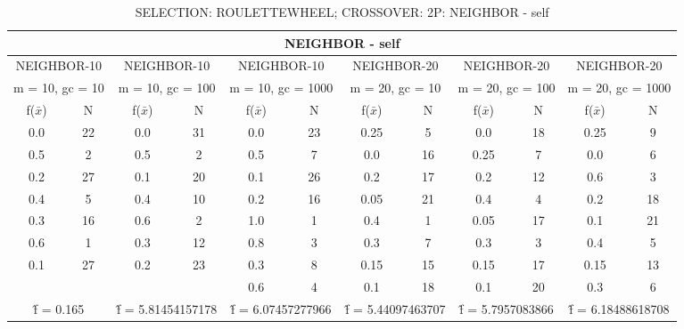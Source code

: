 \begin{table}[H]
	\centering
	\caption{SELECTION: ROULETTEWHEEL; CROSSOVER: 2P: NEIGHBOR - self}
	\begin{adjustbox}{width=1\textwidth}
		\begin{tabular}{ |c|c||c|c||c|c||c|c||c|c||c|c| }
			\hline
			\multicolumn{12}{|c|}{NEIGHBOR - self} \\
			\hline
			\multicolumn{2}{|c||}{NEIGHBOR-10} & \multicolumn{2}{c||}{NEIGHBOR-10} & \multicolumn{2}{c||}{NEIGHBOR-10} & \multicolumn{2}{c||}{NEIGHBOR-20} & \multicolumn{2}{c||}{NEIGHBOR-20} & \multicolumn{2}{c|}{NEIGHBOR-20}\\
			\hline
			\multicolumn{2}{|c||}{m = 10, gc = 10} & \multicolumn{2}{c||}{m = 10, gc = 100} & \multicolumn{2}{c||}{m = 10, gc = 1000} & \multicolumn{2}{c||}{m = 20, gc = 10} & \multicolumn{2}{c||}{m = 20, gc = 100} & \multicolumn{2}{c|}{m = 20, gc = 1000}\\
			\hline
			f($\bar{x}$) & N & f($\bar{x}$) & N & f($\bar{x}$) & N & f($\bar{x}$) & N & f($\bar{x}$) & N & f($\bar{x}$) & N\\
			\hline
			\hline
			0.0 & 22 & 0.0 & 31 & 0.0 & 23 & 0.25 & 5 & 0.0 & 18 & 0.25 & 9\\
			0.5 & 2 & 0.5 & 2 & 0.5 & 7 & 0.0 & 16 & 0.25 & 7 & 0.0 & 6\\
			0.2 & 27 & 0.1 & 20 & 0.1 & 26 & 0.2 & 17 & 0.2 & 12 & 0.6 & 3\\
			0.4 & 5 & 0.4 & 10 & 0.2 & 16 & 0.05 & 21 & 0.4 & 4 & 0.2 & 18\\
			0.3 & 16 & 0.6 & 2 & 1.0 & 1 & 0.4 & 1 & 0.05 & 17 & 0.1 & 21\\
			0.6 & 1 & 0.3 & 12 & 0.8 & 3 & 0.3 & 7 & 0.3 & 3 & 0.4 & 5\\
			0.1 & 27 & 0.2 & 23 & 0.3 & 8 & 0.15 & 15 & 0.15 & 17 & 0.15 & 13\\
			&   &   &   & 0.6 & 4 & 0.1 & 18 & 0.1 & 20 & 0.3 & 6\\
			\hline
			\multicolumn{2}{|c||}{\^{f} = 0.165} & \multicolumn{2}{c||}{\^{f} = 5.81454157178} & \multicolumn{2}{c||}{\^{f} = 6.07457277966} & \multicolumn{2}{c||}{\^{f} = 5.44097463707} & \multicolumn{2}{c||}{\^{f} = 5.7957083866} & \multicolumn{2}{c|}{\^{f} = 6.18488618708}\\
			\hline
		\end{tabular}
	\end{adjustbox}
\end{table}
